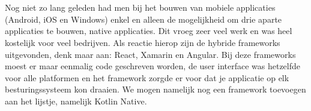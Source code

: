 %
%

%



\chapter*{}

Nog niet zo lang geleden had men bij het bouwen van mobiele applicaties (Android, iOS en Windows) enkel en alleen de mogelijkheid om drie aparte applicaties te bouwen, native applicaties. Dit vroeg zeer veel werk en was heel kostelijk voor veel bedrijven. Als reactie hierop zijn de hybride frameworks uitgevonden, denk maar aan: React, Xamarin en Angular. Bij deze frameworks moest er maar eenmalig code geschreven worden, de user interface was hetzelfde voor alle platformen en het framework zorgde er voor dat je applicatie op elk besturingssysteem kon draaien. We mogen namelijk nog een framework toevoegen aan het lijstje, namelijk Kotlin Native.

